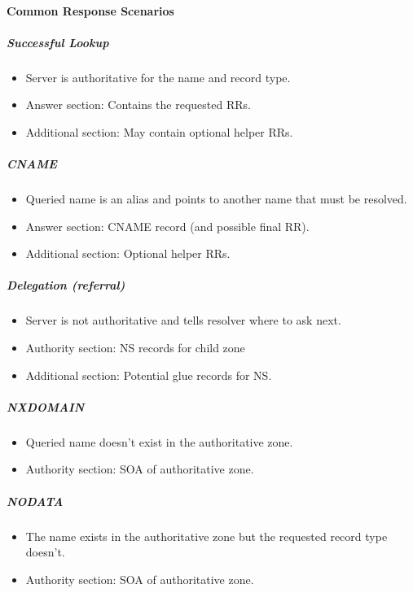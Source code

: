 \documentclass{article}
\begin{document}
\paragraph{Common Response Scenarios}

\subparagraph{Successful Lookup}

\begin{itemize}
    \item Server is authoritative for the name and record type.
    \item Answer section: Contains the requested RRs.
    \item Additional section: May contain optional helper RRs.
\end{itemize}

\subparagraph{CNAME}

\begin{itemize}
    \item Queried name is an alias and points to another name that must be resolved.
    \item Answer section: CNAME record (and possible final RR).
    \item Additional section: Optional helper RRs.
\end{itemize}

\subparagraph{Delegation (referral)}

\begin{itemize}
    \item Server is not authoritative and tells resolver where to ask next.
    \item Authority section: NS records for child zone \item Additional section: Potential glue records for NS.
\end{itemize}

\subparagraph{NXDOMAIN}

\begin{itemize}
    \item Queried name doesn't exist in the authoritative zone.
    \item Authority section: SOA of authoritative zone.
\end{itemize}

\subparagraph{NODATA}

\begin{itemize}
    \item The name exists in the authoritative zone but the requested record type doesn't.
    \item Authority section: SOA of authoritative zone.
\end{itemize}
\end{document}
